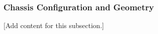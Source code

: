 
\subsubsection{Chassis Configuration and Geometry}
\label{subsubsec:design_3_1_chassis_configuration_geometry}

[Add content for this subsection.]
